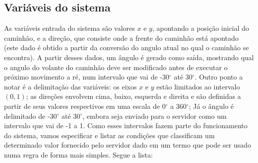 \documentclass{article}
\begin{document}
    \subsection*{Variáveis do sistema}
        As variáveis entrada do sistema são valores $x$ e $y$, apontando a
        posição inicial do caminhão, e a direção, que consiste onde a frente do
        caminhão está apontado (este dado é obtido a partir da conversão do
        angulo atual no qual o caminhão se encontra). A partir desses dados, um
        ângulo é gerado como saída, mostrando qual o angulo do volante do
        caminhão deve ser modificado antes de executar o próximo movimento a
        ré, num intervalo que vai de -30$^\circ$ até 30$^\circ$. Outro ponto a
        notar é a delimitação das variáveis: os eixos $x$ e $y$ estão limitados
        ao intervalo $(0, 1)$; as direções envolvem cima, baixo, esquerda e
        direita e são definidas a partir de seus valores respectivos em uma
        escala de 0$^\circ$ a 360$^\circ$; Já o ângulo é delimitado de
        -30$^\circ$ até 30$^\circ$, embora seja enviado para o servidor como um
        intervalo que vai de -1 a 1. Como esses intervalos fazem parte do
        funcionamento do sistema, vamos especificar e listar as condições que
        classificam um determinado valor fornecido pelo servidor dado em um
        termo que pode ser usado numa regra de forma mais simples. Segue a
        lista:
\end{document}
